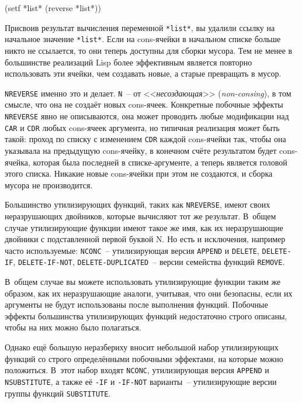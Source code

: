 \begin{myverb}
(setf *list* (reverse *list*))
\end{myverb}

Присвоив результат вычисления переменной \lstinline{*list*}, вы удалили ссылку на начальное
значение \lstinline{*list*}. Если на cons-ячейки в начальном списке больше никто не ссылается,
то они теперь доступны для сборки мусора. Тем не менее в большинстве реализаций Lisp более
эффективным является повторно использовать эти ячейки, чем создавать новые, а старые
превращать в мусор.

\lstinline{NREVERSE} именно это и делает. \lstinline{N}~-- от <<\textit{несоздающая}>> (\textit{non-consing}),
в том смысле, что она не создаёт новых cons-ячеек. Конкретные побочные эффекты \lstinline{NREVERSE}
явно не описываются, она может проводить любые модификации над \lstinline{CAR} и \lstinline{CDR}
любых cons-ячеек аргумента, но типичная реализация может быть такой: проход по списку с
изменением \lstinline{CDR} каждой cons-ячейки так, чтобы она указывала на предыдущую
cons-ячейку, в конечном счёте результатом будет cons-ячейка, которая была последней в
списке-аргументе, а теперь является головой этого списка. Никакие новые cons-ячейки при
этом не создаются, и сборка мусора не производится.

Большинство утилизирующих функций, таких как \lstinline{NREVERSE}, имеют своих неразрушающих
двойников, которые вычисляют тот же результат. В~общем случае утилизирующие функции имеют
такое же имя, как их неразрушающие двойники с подставленной первой буквой N. Но есть и
исключения, например часто используемые: \lstinline{NCONC}~-- утилизирующая версия
\lstinline{APPEND} и \lstinline{DELETE}, \lstinline{DELETE-IF}, \lstinline{DELETE-IF-NOT},
\lstinline{DELETE-DUPLICATED}~-- версии семейства функций \lstinline{REMOVE}.

В~общем случае вы можете использовать утилизирующие функции таким же образом, как их
неразрушающие аналоги, учитывая, что они безопасны, если их аргументы не будут
использованы после выполнения функций. Побочные эффекты большинства утилизирующих функций
недостаточно строго описаны, чтобы на них можно было полагаться.

Однако ещё большую неразбериху вносит небольшой набор утилизирующих функций со строго
определёнными побочными эффектами, на которые можно положиться. В~этот набор входят
\lstinline{NCONC}, утилизирующая версия \lstinline{APPEND} и \lstinline{NSUBSTITUTE}, а также её \lstinline{-IF} и
\lstinline{-IF-NOT} варианты~-- утилизирующие версии группы функций \lstinline{SUBSTITUTE}.

